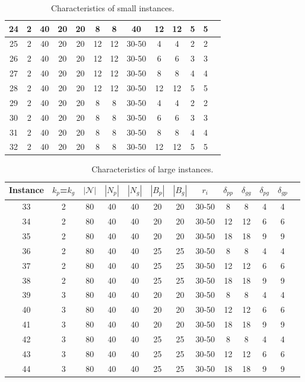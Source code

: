\documentclass[11pt]{article}
\begin{document}
\begin{table}[t!]
\begin{tabular}{@{}ccccccccccccc@{}}
24 & 2 & 40 & 20 & 20 & 8 & 8 & 40 & 12 & 12 & 5 & 5 \\\hline
25 & 2 & 40 & 20 & 20 & 12 & 12 & 30-50 & 4 & 4 & 2 & 2 \\
26 & 2 & 40 & 20 & 20 & 12 & 12 & 30-50 & 6 & 6 & 3 & 3 \\
27 & 2 & 40 & 20 & 20 & 12 & 12 & 30-50 & 8 & 8 & 4 & 4 \\
28 & 2 & 40 & 20 & 20 & 12 & 12 & 30-50 & 12 & 12 & 5 & 5 \\\hline
29 & 2 & 40 & 20 & 20 & 8 & 8 & 30-50 & 4 & 4 & 2 & 2 \\
30 & 2 & 40 & 20 & 20 & 8 & 8 & 30-50 & 6 & 6 & 3 & 3 \\
31 & 2 & 40 & 20 & 20 & 8 & 8 & 30-50 & 8 & 8 & 4 & 4 \\
32 & 2 & 40 & 20 & 20 & 8 & 8 & 30-50 & 12 & 12 & 5 & 5 \\ \bottomrule
\end{tabular}
\caption{Characteristics of small instances.}
	\label{instance_information}%
\end{table}


\begin{table}[h!]
    \footnotesize
    \centering
\begin{tabular}{@{}ccccccccccccc@{}}
\toprule
Instance & $k_p$=$k_g$ & $|\mathcal{N}|$ & $|N_p|$ & $|N_g|$ & $|B_p|$ & $|B_g|$ & $r_i$ & $\delta_{pp}$ & $\delta_{gg}$ & $\delta_{pg}$ & $\delta_{gp}$ \\ \midrule
33 & 2 & 80 & 40 & 40 & 20 & 20 & 30-50 & 8 & 8 & 4 & 4 \\
34 & 2 & 80 & 40 & 40 & 20 & 20 & 30-50 & 12 & 12 & 6 & 6 \\
35 & 2 & 80 & 40 & 40 & 20 & 20 & 30-50 & 18 & 18 & 9 & 9 \\
36 & 2 & 80 & 40 & 40 & 25 & 25 & 30-50 & 8 & 8 & 4 & 4 \\
37 & 2 & 80 & 40 & 40 & 25 & 25 & 30-50 & 12 & 12 & 6 & 6 \\
38 & 2 & 80 & 40 & 40 & 25 & 25 & 30-50 & 18 & 18 & 9 & 9 \\\hline
39 & 3 & 80 & 40 & 40 & 20 & 20 & 30-50 & 8 & 8 & 4 & 4 \\
40 & 3 & 80 & 40 & 40 & 20 & 20 & 30-50 & 12 & 12 & 6 & 6 \\
41 & 3 & 80 & 40 & 40 & 20 & 20 & 30-50 & 18 & 18 & 9 & 9 \\
42 & 3 & 80 & 40 & 40 & 25 & 25 & 30-50 & 8 & 8 & 4 & 4 \\
43 & 3 & 80 & 40 & 40 & 25 & 25 & 30-50 & 12 & 12 & 6 & 6 \\
44 & 3 & 80 & 40 & 40 & 25 & 25 & 30-50 & 18 & 18 & 9 & 9 \\\bottomrule
\end{tabular}
\caption{Characteristics of large instances.}
	\label{_largeinstance_information}%
\end{table}
\end{document}

